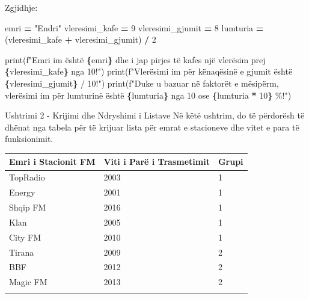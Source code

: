 \documentclass[
  ignorenonframetext,
]{beamer}
\newenvironment{Shaded}{\begin{snugshade}}{\end{snugshade}}
\newcommand{\BuiltInTok}[1]{#1}
\newcommand{\DecValTok}[1]{\textcolor[rgb]{0.00,0.00,0.81}{#1}}
\newcommand{\NormalTok}[1]{#1}
\newcommand{\OperatorTok}[1]{\textcolor[rgb]{0.81,0.36,0.00}{\textbf{#1}}}
\newcommand{\SpecialCharTok}[1]{\textcolor[rgb]{0.81,0.36,0.00}{\textbf{#1}}}
\newcommand{\SpecialStringTok}[1]{\textcolor[rgb]{0.31,0.60,0.02}{#1}}
\newcommand{\StringTok}[1]{\textcolor[rgb]{0.31,0.60,0.02}{#1}}
\begin{document}
\begin{frame}[fragile]{Zgjidhje:}
\protect\hypertarget{zgjidhje}{}
\begin{Shaded}
\begin{Highlighting}[]
\NormalTok{emri }\OperatorTok{=} \StringTok{"Endri"}
\NormalTok{vleresimi\_kafe }\OperatorTok{=} \DecValTok{9}
\NormalTok{vleresimi\_gjumit }\OperatorTok{=} \DecValTok{8}
\NormalTok{lumturia }\OperatorTok{=}\NormalTok{ (vleresimi\_kafe }\OperatorTok{+}\NormalTok{ vleresimi\_gjumit) }\OperatorTok{/} \DecValTok{2}

\BuiltInTok{print}\NormalTok{(}\SpecialStringTok{f"Emri im është }\SpecialCharTok{\{}\NormalTok{emri}\SpecialCharTok{\}}\SpecialStringTok{ dhe i jap pirjes të kafes një vlerësim prej }\SpecialCharTok{\{}\NormalTok{vleresimi\_kafe}\SpecialCharTok{\}}\SpecialStringTok{ nga 10!"}\NormalTok{)}
\BuiltInTok{print}\NormalTok{(}\SpecialStringTok{f"Vlerësimi im për kënaqësinë e gjumit është }\SpecialCharTok{\{}\NormalTok{vleresimi\_gjumit}\SpecialCharTok{\}}\SpecialStringTok{ / 10!"}\NormalTok{)}
\BuiltInTok{print}\NormalTok{(}\SpecialStringTok{f"Duke u bazuar në faktorët e mësipërm, vlerësimi im për lumturinë është }\SpecialCharTok{\{}\NormalTok{lumturia}\SpecialCharTok{\}}\SpecialStringTok{ nga 10 ose }\SpecialCharTok{\{}\NormalTok{lumturia }\OperatorTok{*} \DecValTok{10}\SpecialCharTok{\}}\SpecialStringTok{ \%!"}\NormalTok{)}
\end{Highlighting}
\end{Shaded}
\end{frame}

\begin{frame}{Ushtrimi 2 - Krijimi dhe Ndryshimi i Listave}
\protect\hypertarget{ushtrimi-2---krijimi-dhe-ndryshimi-i-listave}{}
Në këtë ushtrim, do të përdorësh të dhënat nga tabela për të krijuar
lista për emrat e stacioneve dhe vitet e para të funksionimit.

\begin{longtable}[]{@{}lll@{}}
\toprule\noalign{}
Emri i Stacionit FM & Viti i Parë i Trasmetimit & Grupi \\
\midrule\noalign{}
\endhead
TopRadio & 2003 & 1 \\
Energy & 2001 & 1 \\
Shqip FM & 2016 & 1 \\
Klan & 2005 & 1 \\
City FM & 2010 & 1 \\
Tirana & 2009 & 2 \\
BBF & 2012 & 2 \\
Magic FM & 2013 & 2 \\
\bottomrule\noalign{}
\end{longtable}
\end{frame}
\end{document}
